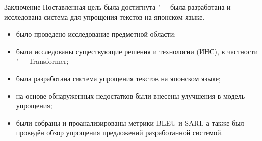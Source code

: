 \begin{frame}[fragile]{Заключение}%
  Поставленная цель была достигнута "--- была разработана и исследована система для упрощения текстов на японском языке. 

  \begin{itemize}%
    \item было проведено исследование предметной области;
    \item были исследованы существующие решения и технологии (ИНС), в частности "--- Transformer;
    \item была разработана система упрощения текстов на японском языке;
    \item на основе обнаруженных недостатков были внесены улучшения в модель упрощения;
    \item были собраны и проанализированы метрики BLEU и SARI, а также был проведён обзор упрощения предложений разработанной системой.
  \end{itemize}
\end{frame}
